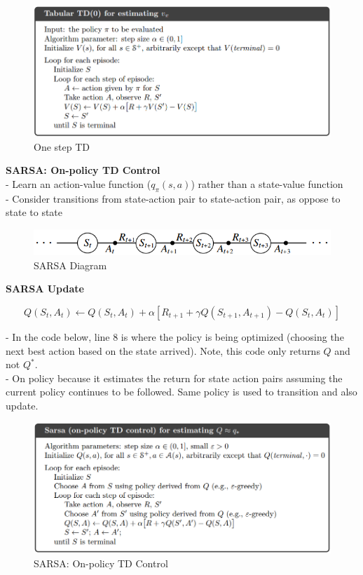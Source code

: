 \documentclass{article}
\begin{document}
\begin{figure}[h]
\includegraphics[scale=0.4]{onestep_td}
\centering
\caption{One step TD}
\end{figure}

\noindent
\textbf{SARSA: On-policy TD Control}\\
- Learn an action-value function ($q_{\pi}(s, a)$) rather than a state-value function\\
- Consider transitions from state-action pair to state-action pair, as oppose to
state to state\\

\begin{figure}[h]
\includegraphics[scale=0.5]{sarsa_diagram}
\centering
\caption{SARSA Diagram}
\end{figure}

\newpage
\noindent
\textbf{SARSA Update}

\begin{equation}
Q\left(S_{t}, A_{t}\right) \leftarrow Q\left(S_{t}, A_{t}\right)+\alpha\left[R_{t+1}+\gamma Q\left(S_{t+1}, A_{t+1}\right)-Q\left(S_{t}, A_{t}\right)\right]
\end{equation}

\noindent
- In the code below, line 8 is where the policy is being optimized (choosing the
next best action based on the state arrived). Note, this code only returns $Q$
and not $Q^{*}$.\\
- On policy because it estimates the return for state action pairs assuming the
current policy continues to be followed. Same policy is used to transition and
also update.

\begin{figure}[h]
\includegraphics[scale=0.4]{onpolicy_sarsa}
\centering
\caption{SARSA: On-policy TD Control}
\end{figure}
\end{document}
